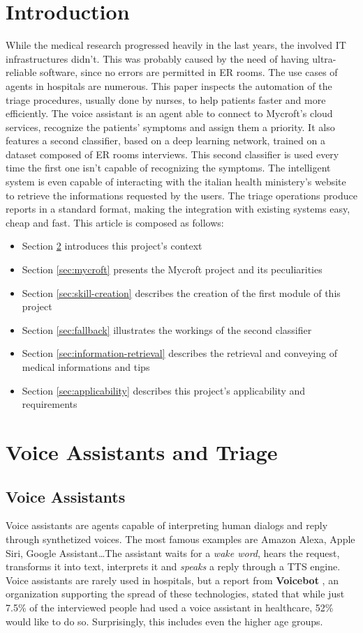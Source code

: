 \documentclass[conference]{IEEEtran}
\begin{document}
\section{Introduction}
While the medical research progressed heavily in the last years, the involved IT infrastructures didn't. This was probably caused by the need of having ultra-reliable software, since no errors are permitted in ER rooms. The use cases of agents in hospitals are numerous. This paper inspects the automation of the triage procedures, usually done by nurses, to help patients faster and more efficiently. The voice assistant is an agent able to connect to Mycroft's cloud services, recognize the patients' symptoms and assign them a priority. It also features a second classifier, based on a deep learning network, trained on a dataset composed of ER rooms interviews. This second classifier is used every time the first one isn't capable of recognizing the symptoms. The intelligent system is even capable of interacting with the italian health ministery's website to retrieve the informations requested by the users. The triage operations produce reports in a standard format, making the integration with existing systems easy, cheap and fast. This article is composed as follows:
\begin{itemize}
    \item Section \ref{sec:voice-assistants-and-triage} introduces this project's context
    \item Section \ref{sec:mycroft} presents the Mycroft project and its peculiarities
    \item Section \ref{sec:skill-creation} describes the creation of the first module of this project
    \item Section \ref{sec:fallback} illustrates the workings of the second classifier
    \item Section \ref{sec:information-retrieval} describes the retrieval and conveying of medical informations and tips
    \item Section \ref{sec:applicability} describes this project's applicability and requirements
\end{itemize}

\section{Voice Assistants and Triage}
\label{sec:voice-assistants-and-triage}
\subsection{Voice Assistants}
Voice assistants are agents capable of interpreting human dialogs and reply through synthetized voices. The most famous examples are Amazon Alexa, Apple Siri, Google Assistant\dots The assistant waits for a \textit{wake word}, hears the request, transforms it into text, interprets it and \textit{speaks} a reply through a TTS engine. Voice assistants are rarely used in hospitals, but a report from \textbf{Voicebot} \cite{voicebot}, an organization supporting the spread of these technologies, stated that while just 7.5\% of the interviewed people had used a voice assistant in healthcare, 52\% would like to do so. Surprisingly, this includes even the higher age groups.
\end{document}
